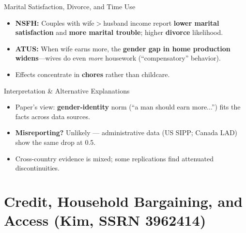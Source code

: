 \documentclass[11pt,notes=hide,aspectratio=169,mathserif]{beamer}
\begin{document}
\begin{frame}{Marital Satisfaction, Divorce, and Time Use}
\small
\begin{itemize}
  \item \textbf{NSFH:} Couples with wife$>$husband income report \textbf{lower marital satisfaction} and \textbf{more marital trouble}; higher \textbf{divorce} likelihood.
  \item \textbf{ATUS:} When wife earns more, the \textbf{gender gap in home production widens}—wives do even \emph{more} housework (``compensatory'' behavior).
  \item Effects concentrate in \textbf{chores} rather than childcare.
\end{itemize}
\end{frame}

\begin{frame}{Interpretation \& Alternative Explanations}
\small
\begin{itemize}
  \item Paper’s view: \textbf{gender-identity} norm (``a man should earn more...'') fits the facts across data sources.
  \item \textbf{Misreporting?} Unlikely — administrative data (US SIPP; Canada LAD) show the same drop at 0.5.
  \item Cross-country evidence is mixed; some replications find attenuated discontinuities. 
\end{itemize}
\end{frame}

\section{Credit, Household Bargaining, and Access (Kim, SSRN 3962414)}
\end{document}
